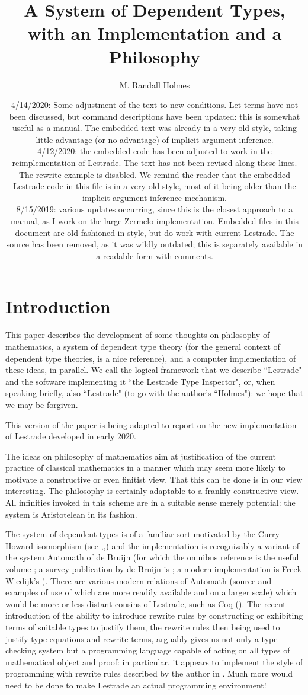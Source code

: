 \documentclass[12pt]{article}
\title{A System of Dependent Types, with an Implementation and a Philosophy}
\author{M. Randall Holmes}
\date{4/14/2020:  Some adjustment of the text to new conditions.  Let terms have not been discussed, but command descriptions have been updated:  this is somewhat useful as a manual.  The embedded text was already in a very old style, taking little advantage (or no advantage) of implicit argument inference.\\4/12/2020:  the embedded code has been adjusted to work in the reimplementation of Lestrade.  The text has not been revised along these lines.  The rewrite example is disabled.  We remind the reader that the embedded Lestrade code in this file is in a very old style, most of it being older than the implicit argument inference mechanism.\\
8/15/2019:  various updates occurring, since this is the closest approach to a manual, as I work on the large Zermelo implementation.  Embedded files in this document are old-fashioned in style, but do work with current Lestrade.  The source has been removed, as it was wildly outdated;  this is separately available in a readable form with comments.}
\begin{document}
\maketitle

\newpage

\tableofcontents

\newpage

\section{Introduction}

This paper describes the development of some thoughts on philosophy of mathematics, a system of dependent type theory (for the general context of dependent type theories, \cite{barendregt} is a nice reference), and a computer implementation of these ideas, in parallel.  We call the logical framework that we describe ``Lestrade" and the software implementing it ``the Lestrade Type Inspector", or, when speaking briefly, also ``Lestrade"  (to go with the author's ``Holmes"):  we hope that we may be forgiven.

This version of the paper is being adapted to report on the new implementation of Lestrade developed in early 2020.

The ideas on philosophy of mathematics aim at justification of the current practice of classical mathematics in a manner which may seem more likely to motivate a constructive or even finitist view.  That this can be done is in our view interesting.   The philosophy is certainly adaptable to a frankly constructive view.  All infinities invoked in this scheme are in a suitable sense merely potential:  the system is Aristotelean in its fashion.

The system of dependent types is of a familiar sort motivated by the Curry-Howard isomorphism (see \cite{curryfeys},\cite{howard},\cite{debruijntypes}) and the implementation is recognizably a variant of the system Automath of de Bruijn (for which the omnibus reference is the useful volume \cite{automathbook}; a survey publication by de Bruijn is \cite{thelanguage};  a modern implementation is Freek Wiedijk's \cite{freek}).  There are various modern relations of Automath (source and examples of use of which are more readily available and on a larger scale) which would be more or less distant cousins of Lestrade, such as Coq  (\cite{coq}).  The recent introduction of the ability to introduce rewrite rules by constructing or exhibiting terms of suitable types to justify them, the rewrite rules then being used to justify type equations and rewrite terms, arguably gives us not only a type checking system but a programming language capable of acting on all types of mathematical object and proof:  in particular, it appears to implement the style of programming with rewrite rules described by the author in \cite{holmesrewriting}.   Much more would need to be done to make Lestrade an actual programming environment!
\end{document}
